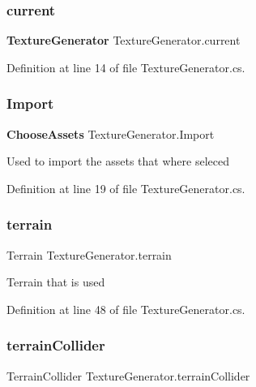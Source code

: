 \subsubsection{current}
{\footnotesize\ttfamily \textbf{ Texture\+Generator} Texture\+Generator.\+current\hspace{0.3cm}{\ttfamily [static]}}



Definition at line 14 of file Texture\+Generator.\+cs.

\mbox{\label{class_texture_generator_a11235416c6a687aaabe39b1aed2f1484}} 
\subsubsection{Import}
{\footnotesize\ttfamily \textbf{ Choose\+Assets} Texture\+Generator.\+Import}



Used to import the assets that where seleced 



Definition at line 19 of file Texture\+Generator.\+cs.

\mbox{\label{class_texture_generator_a19b6ab7c2d26faf265c09475a7b5dd80}} 
\subsubsection{terrain}
{\footnotesize\ttfamily Terrain Texture\+Generator.\+terrain}



Terrain that is used 



Definition at line 48 of file Texture\+Generator.\+cs.

\mbox{\label{class_texture_generator_a8fffd5fbbe92541b67b207e166f9e7ca}} 
\subsubsection{terrain\+Collider}
{\footnotesize\ttfamily Terrain\+Collider Texture\+Generator.\+terrain\+Collider}



